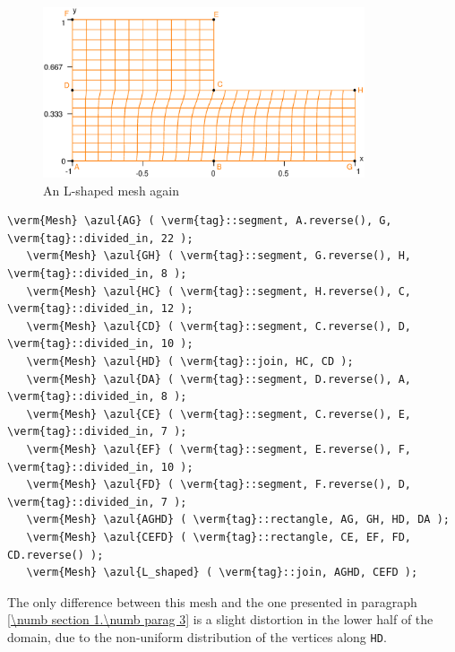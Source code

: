 \begin{figure}[ht] \centering
  \includegraphics[width=95mm]{L-shaped-distorted}
  \caption{An L-shaped mesh again}
  \label{\numb section 2.\numb fig 1}
\end{figure}

\begin{Verbatim}[commandchars=\\\{\},formatcom=\small\tt,frame=single,
   label=parag-\ref{\numb section 2.\numb parag 1}.cpp,rulecolor=\color{coment},
   baselinestretch=0.94,framesep=2mm]
   \verm{Mesh} \azul{AG} ( \verm{tag}::segment, A.reverse(), G, \verm{tag}::divided_in, 22 );
   \verm{Mesh} \azul{GH} ( \verm{tag}::segment, G.reverse(), H, \verm{tag}::divided_in, 8 );
   \verm{Mesh} \azul{HC} ( \verm{tag}::segment, H.reverse(), C, \verm{tag}::divided_in, 12 );
   \verm{Mesh} \azul{CD} ( \verm{tag}::segment, C.reverse(), D, \verm{tag}::divided_in, 10 );
   \verm{Mesh} \azul{HD} ( \verm{tag}::join, HC, CD );
   \verm{Mesh} \azul{DA} ( \verm{tag}::segment, D.reverse(), A, \verm{tag}::divided_in, 8 );
   \verm{Mesh} \azul{CE} ( \verm{tag}::segment, C.reverse(), E, \verm{tag}::divided_in, 7 );
   \verm{Mesh} \azul{EF} ( \verm{tag}::segment, E.reverse(), F, \verm{tag}::divided_in, 10 );
   \verm{Mesh} \azul{FD} ( \verm{tag}::segment, F.reverse(), D, \verm{tag}::divided_in, 7 );
   \verm{Mesh} \azul{AGHD} ( \verm{tag}::rectangle, AG, GH, HD, DA );
   \verm{Mesh} \azul{CEFD} ( \verm{tag}::rectangle, CE, EF, FD, CD.reverse() );
   \verm{Mesh} \azul{L_shaped} ( \verm{tag}::join, AGHD, CEFD );
\end{Verbatim}

The only difference between this mesh and the one presented in paragraph
\ref{\numb section 1.\numb parag 3} is a slight distortion in the lower half of the domain,
due to the non-uniform distribution of the vertices along {\small\tt HD}.

